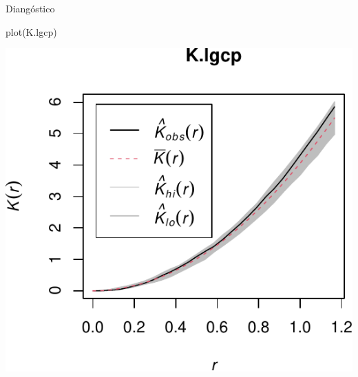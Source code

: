 \documentclass[
  11pt,
  ignorenonframetext,
]{beamer}
\newenvironment{Shaded}{}{}
\newcommand{\FunctionTok}[1]{\textcolor[rgb]{0.02,0.16,0.49}{#1}}
\newcommand{\NormalTok}[1]{#1}
\begin{document}
\begin{frame}[fragile]{Diangóstico}
\protect\hypertarget{dianguxf3stico-2}{}
\begin{Shaded}
\begin{Highlighting}[]
\FunctionTok{plot}\NormalTok{(K.lgcp)}
\end{Highlighting}
\end{Shaded}

\begin{center}\includegraphics{Tutorial-spatstat-2_files/figure-beamer/unnamed-chunk-40-1} \end{center}
\end{frame}
\end{document}
